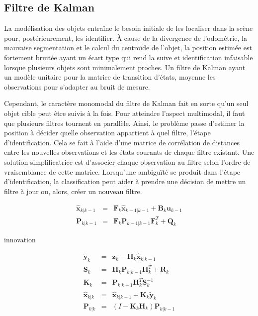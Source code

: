 \subsection{Filtre de Kalman }

La modélisation des objets entraîne le besoin initiale de les
localiser dans la scène pour, postérieurement, les identifier. À cause
de la divergence de l'odométrie, la mauvaise segmentation et le calcul
du centroïde de l'objet, la position estimée est fortement bruitée
ayant un écart type qui rend la suive et identification infaisable
lorsque plusieurs objets sont minimalement proches. Un filtre de
Kalman ayant un modèle unitaire pour la matrice de transition d'états,
moyenne les observations pour s'adapter au bruit de mesure.

Cependant, le caractère monomodal du filtre de Kalman fait en sorte
qu'un seul objet cible peut être suivis à la fois. Pour atteindre
l'aspect multimodal, il faut que plusieurs filtres tournent en
parallèle. Ainsi, le problème passe d’estimer la position à décider
quelle observation appartient à quel filtre, l'étape
d'identification. Cela se fait à l'aide d'une matrice de corrélation
de distances entre les nouvelles observations et les états courants de
chaque filtre existant. Une solution simplificatrice est d'associer
chaque observation au filtre selon l'ordre de vraisemblance de cette
matrice. Lorsqu’une ambiguïté se produit dans l'étape
d'identification, la classification peut aider à prendre une décision
de mettre un filtre à jour ou, alors, créer un nouveau filtre.



\begin{equation*}
	\begin{array}{ccl}
		\hat{\textbf{x}}_{k|k-1} &=& \textbf{F}_{k}\hat{\textbf{x}}_{k-1|k-1} + \textbf{B}_{k} \textbf{u}_{k-1}\\
		\textbf{P}_{k|k-1} &=& \textbf{F}_{k} \textbf{P}_{k-1|k-1} \textbf{F}_{k}^{T} + \textbf{Q}_{k}
	\end{array}
\end{equation*}

innovation

\begin{equation*}
	\begin{array}{ccl}
\tilde{\textbf{y}}_{k} &=& \textbf{z}_{k} - \textbf{H}_{k}\hat{\textbf{x}}_{k|k-1} \\
\textbf{S}_{k} &=& \textbf{H}_{k}\textbf{P}_{k|k-1} \textbf{H}_{k}^{T}+\textbf{R}_{k} \\
\textbf{K}_{k} &=& \textbf{P}_{k|k-1}\textbf{H}_{k}^{T}\textbf{S}_{k}^{-1} \\
\hat{\textbf{x}}_{k|k} &=& \hat{\textbf{x}}_{k|k-1} + \textbf{K}_{k}\tilde{\textbf{y}}_{k} \\
\textbf{P}_{k|k} &=& (I - \textbf{K}_{k} \textbf{H}_{k}) \textbf{P}_{k|k-1}
	\end{array}
\end{equation*}

